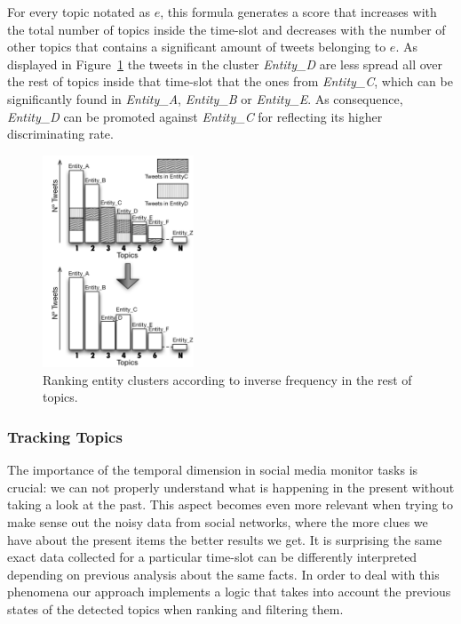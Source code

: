 \documentclass{sig-alternate}
\begin{document}
For every topic notated as $e$, this formula generates a score that increases with the total number of topics inside the time-slot and decreases with the number of other topics that contains a significant amount of tweets belonging to $e$. As displayed in Figure~\ref{fig:TF-IDF} the tweets in the cluster \textit{Entity\_D} are less spread all over the rest of topics inside that time-slot that the ones from \textit{Entity\_C}, which can be significantly found in \textit{Entity\_A},  \textit{Entity\_B} or  \textit{Entity\_E}. As consequence, \textit{Entity\_D} can be promoted against \textit{Entity\_C} for reflecting its higher discriminating rate.

\begin{figure}[h!]
\centering
\includegraphics[width=0.4\textwidth]{figure/TF-IDF.png}
\caption{Ranking entity clusters according to inverse frequency in the rest of topics.}
\label{fig:TF-IDF}
\end{figure}

\subsubsection{Tracking Topics}

The importance of the temporal dimension in social media monitor tasks is crucial: we can not properly understand what is happening in the present without taking a look at the past. This aspect becomes even more relevant when trying to make sense out the noisy data from social networks, where the more clues we have about the present items the better results we get. It is surprising the same exact data collected for a particular time-slot can be differently interpreted depending on previous analysis about the same facts. In order to deal with this phenomena our approach implements a logic that takes into account the previous states of the detected topics when ranking and filtering them. 
\end{document}
